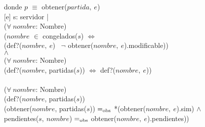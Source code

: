 \begin{Representacion}
    \vspace{2mm}
    donde $p$ $\equiv$ obtener($partida,\ e$) \\

    [e]{
        s: servidor | \\
            \tab ($\forall\ nombre$: Nombre)\\
                \tab\tab ($nombre$ $\in$ congelados($s$) $\Leftrightarrow$ \\
                \tab\tab (def?($nombre,\ e$) \yluego\ $\neg$ obtener($nombre,\ e$).modificable)) \\
            \tab $\wedge$ \\
            \tab ($\forall\ nombre$: Nombre)\\
                \tab\tab (def?($nombre$, partidas($s$)) $\Leftrightarrow$ def?($nombre,\ e$)) \\
            \tab \yluego \\
            \tab ($\forall\ nombre$: Nombre)\\
                \tab\tab (def?($nombre$, partidas($s$)) \impluego \\ 
                \tab\tab (obtener($nombre$, partidas($s$)) $=_{\mathrm{obs}}$ *(obtener($nombre,\ e$).sim) $\wedge$ \\
                \tab\tab pendientes($s,\ nombre$) $=_{\mathrm{obs}}$ obtener($nombre,\ e$).pendientes)) \\
    }  

  \end{Representacion}
  
